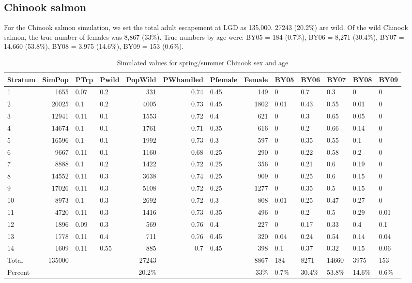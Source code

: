 \documentclass[11pt]{article}
\begin{document}
\subsection{Chinook salmon}

For the Chinook salmon simulation, we set the total adult escapement at LGD as 135,000. 27243 (20.2\%) are wild. Of the wild Chinook salmon, the true number of females was 8,867 (33\%). True numbers by age were: BY05 = 184 (0.7\%), BY06 = 8,271 (30.4\%), BY07 = 14,660 (53.8\%), BY08 = 3,975 (14.6\%), BY09 = 153 (0.6\%).

\begin{sidewaystable} %
\caption{Simulated values for spring/summer Chinook sex and age}
\label{table:CHsimSA} 
\centering
\begin{tabular}{ | l | r | l | l | r | r | l | r | l | l | l | l | l | }
\hline
Stratum&SimPop&PTrp&Pwild&PopWild&PWhandled&Pfemale&Female&BY05&BY06&BY07&BY08&BY09 \\ \hline
1&1655&0.07&0.2&331&0.74&0.45&149&0&0.7&0.3&0&0 \\ \hline
2&20025&0.1&0.2&4005&0.73&0.45&1802&0.01&0.43&0.55&0.01&0 \\ \hline
3&12941&0.11&0.1&1553&0.72&0.4&621&0&0.3&0.65&0.05&0 \\ \hline
4&14674&0.1&0.1&1761&0.71&0.35&616&0&0.2&0.66&0.14&0 \\ \hline
5&16596&0.1&0.1&1992&0.73&0.3&597&0&0.35&0.55&0.1&0 \\ \hline
6&9667&0.11&0.1&1160&0.68&0.25&290&0&0.22&0.58&0.2&0 \\ \hline
7&8888&0.1&0.2&1422&0.72&0.25&356&0&0.21&0.6&0.19&0 \\ \hline
8&14552&0.11&0.3&3638&0.74&0.25&909&0&0.25&0.6&0.15&0 \\ \hline
9&17026&0.11&0.3&5108&0.72&0.25&1277&0&0.35&0.5&0.15&0 \\ \hline
10&8973&0.1&0.3&2692&0.72&0.3&808&0.01&0.25&0.47&0.27&0 \\ \hline
11&4720&0.11&0.3&1416&0.73&0.35&496&0&0.2&0.5&0.29&0.01 \\ \hline
12&1896&0.09&0.3&569&0.76&0.4&227&0&0.17&0.33&0.4&0.1 \\ \hline
13&1778&0.11&0.4&711&0.76&0.45&320&0.04&0.24&0.54&0.14&0.04 \\ \hline
14&1609&0.11&0.55&885&0.7&0.45&398&0.1&0.37&0.32&0.15&0.06 \\ \hline
Total&135000&&&27243&&&8867&184&8271&14660&3975&153 \\ \hline
Percent&&&&20.2\%&&&33\%&0.7\%&30.4\%&53.8\%&14.6\%&0.6\% \\ \hline
\end{tabular}
\end{sidewaystable}
\end{document}
